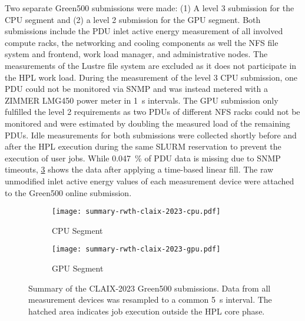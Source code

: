 Two separate Green500 submissions were made: (1) A level 3 submission for the CPU segment and (2) a level 2 submission for the GPU segment.
Both submissions include the \ac{PDU} inlet active energy measurement of all involved compute racks, the networking and cooling components as well the NFS file system and frontend, work load manager, and administrative nodes.
The measurements of the Lustre file system are excluded as it does not participate in the HPL work load.
During the measurement of the level 3 CPU submission, one \ac{PDU} could not be monitored via \ac{SNMP} and was instead metered with a ZIMMER LMG450 power meter in \SI{1}{\second} intervals.
The GPU submission only fulfilled the level 2 requirements as two \acp{PDU} of different NFS racks could not be monitored and were estimated by doubling the measured load of the remaining \acp{PDU}.
Idle measurements for both submissions were collected shortly before and after the HPL execution during the same SLURM reservation to prevent the execution of user jobs.
While \SI{0.047}{\percent} of \ac{PDU} data is missing due to \ac{SNMP} timeouts, \cref{fig:summary-rwth-claix-2023} shows the data after applying a time-based linear fill.
The raw unmodified inlet active energy values of each measurement device were attached to the Green500 online submission.

\begin{figure}[htbp]
    \centering
    \hfill
    \begin{subfigure}{0.45\textwidth}
        \centering
        \texttt{[image: summary-rwth-claix-2023-cpu.pdf]}
        \caption{CPU Segment}
        \label{fig:summary-rwth-claix-2023-cpu}
    \end{subfigure}
    \hfill
    \begin{subfigure}{0.45\textwidth}
        \centering
        \texttt{[image: summary-rwth-claix-2023-gpu.pdf]}
        \caption{GPU Segment}
        \label{fig:summary-rwth-claix-2023-gpu}
    \end{subfigure}
    \hfill
    \caption{Summary of the CLAIX-2023 Green500 submissions. Data from all measurement devices was resampled to a common \SI{5}{\second} interval. The hatched area indicates job execution outside the HPL core phase.}
    \label{fig:summary-rwth-claix-2023}
\end{figure}
